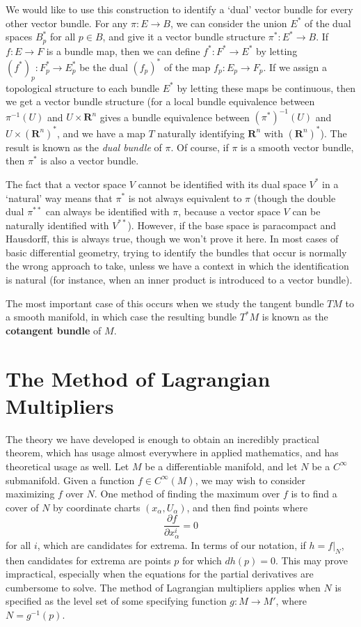 We would like to use this construction to identify a `dual' vector bundle for every other vector bundle. For any $\pi : E \to B$, we can consider the union $E^*$ of the dual spaces $B_p^*$ for all $p \in B$, and give it a vector bundle structure $\pi^*: E^* \to B$. If $f: E \to F$ is a bundle map, then we can define $f^*: F^* \to E^*$ by letting $(f^*)_p: F^*_p \to E^*_p$ be the dual $(f_p)^*$ of the map $f_p: E_p \to F_p$. If we assign a topological structure to each bundle $E^*$ by letting these maps be continuous, then we get a vector bundle structure (for a local bundle equivalence between $\pi^{-1}(U)$ and $U \times \mathbf{R}^n$ gives a bundle equivalence between $(\pi^*)^{-1}(U)$ and $U \times (\mathbf{R}^n)^*$, and we have a map $T$ naturally identifying $\mathbf{R}^n$ with $(\mathbf{R}^n)^*$). The result is known as the {\it dual bundle} of $\pi$. Of course, if $\pi$ is a smooth vector bundle, then $\pi^*$ is also a vector bundle.

The fact that a vector space $V$ cannot be identified with its dual space $V^*$ in a `natural' way means that $\pi^*$ is not always equivalent to $\pi$ (though the double dual $\pi^{**}$ can always be identified with $\pi$, because a vector space $V$ can be naturally identified with $V^{**}$). However, if the base space is paracompact and Hausdorff, this is always true, though we won't prove it here. In most cases of basic differential geometry, trying to identify the bundles that occur is normally the wrong approach to take, unless we have a context in which the identification is natural (for instance, when an inner product is introduced to a vector bundle).

The most important case of this occurs when we study the tangent bundle $TM$ to a smooth manifold, in which case the resulting bundle $T^*M$ is known as the {\bf cotangent bundle} of $M$.

\section{The Method of Lagrangian Multipliers}

The theory we have developed is enough to obtain an incredibly practical theorem, which has usage almost everywhere in applied mathematics, and has theoretical usage as well. Let $M$ be a differentiable manifold, and let $N$ be a $C^\infty$ submanifold. Given a function $f \in C^\infty(M)$, we may wish to consider maximizing $f$ over $N$. One method of finding the maximum over $f$ is to find a cover of $N$ by coordinate charts $(x_\alpha,U_\alpha)$, and then find points where
%
\[ \frac{\partial f}{\partial x^i_\alpha} = 0 \]
%
for all $i$, which are candidates for extrema. In terms of our notation, if $h = f|_N$, then candidates for extrema are points $p$ for which $dh(p) = 0$. This may prove impractical, especially when the equations for the partial derivatives are cumbersome to solve. The method of Lagrangian multipliers applies when $N$ is specified as the level set of some specifying function $g: M \to M'$, where $N = g^{-1}(p)$.

